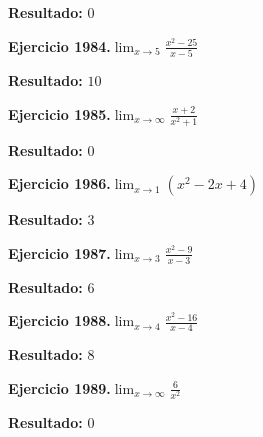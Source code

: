 \documentclass[10pt,a4paper]{article}
\begin{document}
\begin{solbox}
\textbf{Resultado:} \(\displaystyle 0\)
\end{solbox}

\newpage
\begin{ejbox}
\textbf{Ejercicio 1984.}\quad $\lim_{x\to 5} \frac{x^2-25}{x-5}$
\end{ejbox}

\begin{solbox}
\textbf{Resultado:} \(\displaystyle 10\)
\end{solbox}

\begin{ejbox}
\textbf{Ejercicio 1985.}\quad $\lim_{x\to \infty} \frac{x + 2}{x^2 + 1}$
\end{ejbox}

\begin{solbox}
\textbf{Resultado:} \(\displaystyle 0\)
\end{solbox}

\begin{ejbox}
\textbf{Ejercicio 1986.}\quad $\lim_{x\to 1} (x^2 -2x +4)$
\end{ejbox}

\begin{solbox}
\textbf{Resultado:} \(\displaystyle 3\)
\end{solbox}

\newpage
\begin{ejbox}
\textbf{Ejercicio 1987.}\quad $\lim_{x\to 3} \frac{x^2-9}{x-3}$
\end{ejbox}

\begin{solbox}
\textbf{Resultado:} \(\displaystyle 6\)
\end{solbox}

\begin{ejbox}
\textbf{Ejercicio 1988.}\quad $\lim_{x\to 4} \frac{x^2-16}{x-4}$
\end{ejbox}

\begin{solbox}
\textbf{Resultado:} \(\displaystyle 8\)
\end{solbox}

\begin{ejbox}
\textbf{Ejercicio 1989.}\quad $\lim_{x\to \infty} \frac{6}{x^2}$
\end{ejbox}

\begin{solbox}
\textbf{Resultado:} \(\displaystyle 0\)
\end{solbox}
\end{document}
